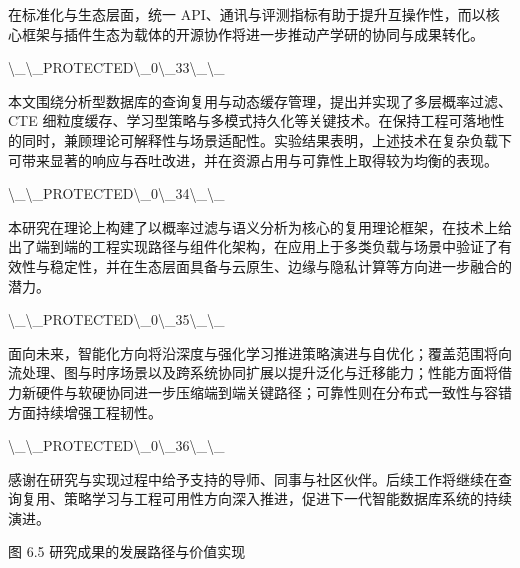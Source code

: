 在标准化与生态层面，统一 API、通讯与评测指标有助于提升互操作性，而以核心框架与插件生态为载体的开源协作将进一步推动产学研的协同与成果转化。

\textbackslash{}_\textbackslash{}_PROTECTED\textbackslash{}_0\textbackslash{}_33\textbackslash{}_\textbackslash{}_

本文围绕分析型数据库的查询复用与动态缓存管理，提出并实现了多层概率过滤、CTE 细粒度缓存、学习型策略与多模式持久化等关键技术。在保持工程可落地性的同时，兼顾理论可解释性与场景适配性。实验结果表明，上述技术在复杂负载下可带来显著的响应与吞吐改进，并在资源占用与可靠性上取得较为均衡的表现。

\textbackslash{}_\textbackslash{}_PROTECTED\textbackslash{}_0\textbackslash{}_34\textbackslash{}_\textbackslash{}_

本研究在理论上构建了以概率过滤与语义分析为核心的复用理论框架，在技术上给出了端到端的工程实现路径与组件化架构，在应用上于多类负载与场景中验证了有效性与稳定性，并在生态层面具备与云原生、边缘与隐私计算等方向进一步融合的潜力。

\textbackslash{}_\textbackslash{}_PROTECTED\textbackslash{}_0\textbackslash{}_35\textbackslash{}_\textbackslash{}_

面向未来，智能化方向将沿深度与强化学习推进策略演进与自优化；覆盖范围将向流处理、图与时序场景以及跨系统协同扩展以提升泛化与迁移能力；性能方面将借力新硬件与软硬协同进一步压缩端到端关键路径；可靠性则在分布式一致性与容错方面持续增强工程韧性。

\textbackslash{}_\textbackslash{}_PROTECTED\textbackslash{}_0\textbackslash{}_36\textbackslash{}_\textbackslash{}_

感谢在研究与实现过程中给予支持的导师、同事与社区伙伴。后续工作将继续在查询复用、策略学习与工程可用性方向深入推进，促进下一代智能数据库系统的持续演进。

图 6.5 研究成果的发展路径与价值实现